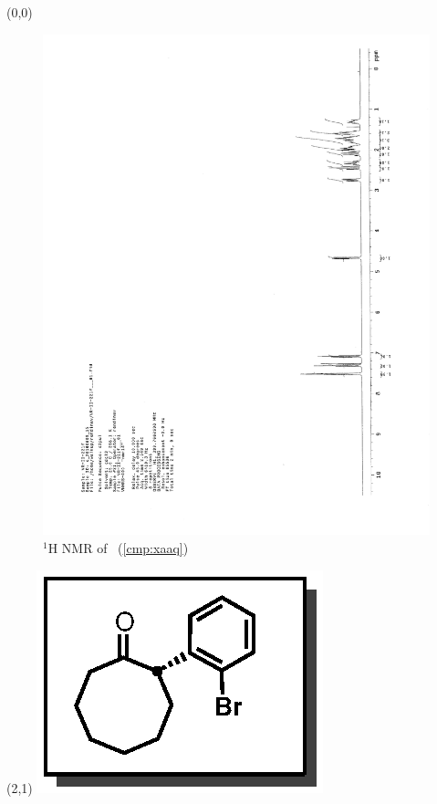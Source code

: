 \begin{textblock}{20}(0,0)
\begin{figure}[htb]
\caption{$^1$H NMR of \CMPxaaq\ (\ref{cmp:xaaq})}
\includegraphics[scale=0.75, trim = 0mm 0mm 0mm 5mm,
clip]{chp_asymmetric/images/nmr/xaaqH}
\vspace{-100pt}
\end{figure}
\end{textblock}
\begin{textblock}{1}(2,1)
\includegraphics[scale=0.8, angle=90]{chp_asymmetric/images/xaaq}
\end{textblock}
